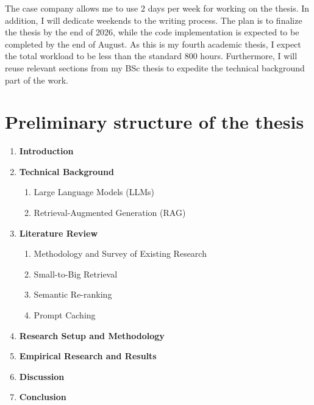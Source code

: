 \documentclass[12pt,a4paper,english,oneside]{article}
\begin{document}
The case company allows me to use 2 days per week for working on the thesis. In addition, I will dedicate weekends to the writing process. The plan is to finalize the thesis by the end of 2026, while the code implementation is expected to be completed by the end of August. As this is my fourth academic thesis, I expect the total workload to be less than the standard 800 hours. Furthermore, I will reuse relevant sections from my BSc thesis to expedite the technical background part of the work.




\section{Preliminary structure of the thesis}
\begin{enumerate}
    \item \textbf{Introduction}
    \item \textbf{Technical Background}
    \begin{enumerate}
        \item Large Language Models (LLMs)
        \item Retrieval-Augmented Generation (RAG)
    \end{enumerate}
    \item \textbf{Literature Review}
    \begin{enumerate}
        \item Methodology and Survey of Existing Research
        \item Small-to-Big Retrieval
        \item Semantic Re-ranking
        \item Prompt Caching
    \end{enumerate}
    \item \textbf{Research Setup and Methodology}
    \item \textbf{Empirical Research and Results}
    \item \textbf{Discussion}
    \item \textbf{Conclusion}
\end{enumerate}
\end{document}
